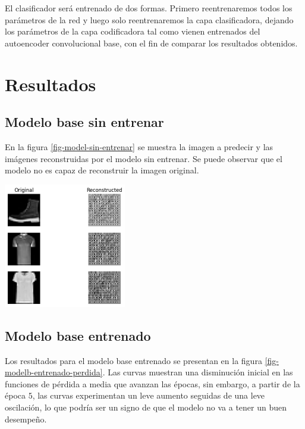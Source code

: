 \documentclass[aps,prl,reprint,groupedaddress]{revtex4-2}
\newenvironment{Figura}
  {\par\medskip\noindent\minipage{\linewidth}}
  {\endminipage\par\medskip}
\begin{document}
El clasificador será entrenado de dos formas. Primero reentrenaremos todos los
parámetros de la red y luego solo reentrenaremos la capa clasificadora, dejando 
los parámetros de la capa codificadora tal como vienen entrenados del autoencoder 
convolucional base, con el fin de comparar los resultados obtenidos.

\section{Resultados}
\subsection{Modelo base sin entrenar}

En la figura \ref{fig-model-sin-entrenar} se muestra la imagen a predecir y las
imágenes reconstruidas por el modelo sin entrenar. Se puede observar que el
modelo no es capaz de reconstruir la imagen original.

\begin{Figura}
  \centering
  \includegraphics[width=0.4\textwidth]{figs1/modelo_sin_entrenar.png}
  \label{fig-model-sin-entrenar}
\end{Figura}

\subsection{Modelo base entrenado}

Los resultados para el modelo base entrenado se presentan en la figura
\ref{fig-modelb-entrenado-perdida}. Las curvas muestran una disminución inicial 
en las funciones de pérdida a media que avanzan las épocas, sin embargo, a 
partir de la época $5$, las curvas experimentan un leve aumento seguidas de 
una leve oscilación, lo que podría ser un signo de que el modelo no va a tener 
un buen desempeño. 
\end{document}

